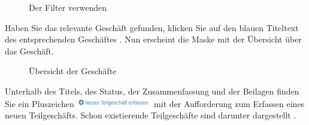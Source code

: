 \begin{figure}[H]
\caption{Der Filter verwenden}
\end{figure}


Haben Sie das relevante Geschäft gefunden, klicken Sie auf den blauen Titeltext des entsprechenden Geschäftes . Nun erscheint die Maske mit der Übersicht über das Geschäft.

\begin{figure}[H]
\caption{Übersicht der Geschäfte}
\end{figure}

Unterhalb des Titels, des Status, der Zusammenfassung und der Beilagen finden Sie ein Pluszeichen \includegraphics[height=12pt]{../chapters/06_Geschaefte/pictures/6-2_TeilgeschaeftErfassen.jpg}  mit der Aufforderung zum Erfassen eines neuen Teilgeschäfts. Schon existierende Teilgeschäfte sind darunter dargestellt .

\vspace{\baselineskip}


